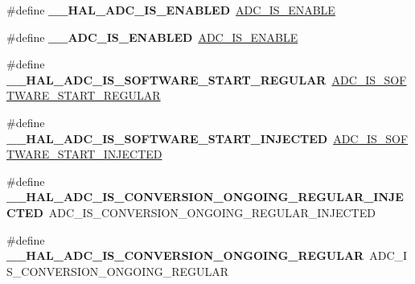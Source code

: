 \begin{DoxyCompactItemize}
\#define {\bfseries \+\_\+\+\_\+\+H\+A\+L\+\_\+\+A\+D\+C\+\_\+\+I\+S\+\_\+\+E\+N\+A\+B\+L\+ED}~\mbox{\hyperlink{group___a_d_c___private___macros_gafe3a7a04ff078c62ae98b19403f696c7}{A\+D\+C\+\_\+\+I\+S\+\_\+\+E\+N\+A\+B\+LE}}
\item 
\mbox{\label{group___h_a_l___a_d_c___aliased___macros_ga32e5ccb7060b98a06749eb20d922d51b}} 
\#define {\bfseries \+\_\+\+\_\+\+A\+D\+C\+\_\+\+I\+S\+\_\+\+E\+N\+A\+B\+L\+ED}~\mbox{\hyperlink{group___a_d_c___private___macros_gafe3a7a04ff078c62ae98b19403f696c7}{A\+D\+C\+\_\+\+I\+S\+\_\+\+E\+N\+A\+B\+LE}}
\item 
\mbox{\label{group___h_a_l___a_d_c___aliased___macros_gad995b81efb72f4fe37152863d465bace}} 
\#define {\bfseries \+\_\+\+\_\+\+H\+A\+L\+\_\+\+A\+D\+C\+\_\+\+I\+S\+\_\+\+S\+O\+F\+T\+W\+A\+R\+E\+\_\+\+S\+T\+A\+R\+T\+\_\+\+R\+E\+G\+U\+L\+AR}~\mbox{\hyperlink{group___a_d_c___private___macros_ga2ccb82ecf85d6c6d1ff2cdf9b6a82d2b}{A\+D\+C\+\_\+\+I\+S\+\_\+\+S\+O\+F\+T\+W\+A\+R\+E\+\_\+\+S\+T\+A\+R\+T\+\_\+\+R\+E\+G\+U\+L\+AR}}
\item 
\mbox{\label{group___h_a_l___a_d_c___aliased___macros_ga5fa40578941f107c4ae1308e14266f7d}} 
\#define {\bfseries \+\_\+\+\_\+\+H\+A\+L\+\_\+\+A\+D\+C\+\_\+\+I\+S\+\_\+\+S\+O\+F\+T\+W\+A\+R\+E\+\_\+\+S\+T\+A\+R\+T\+\_\+\+I\+N\+J\+E\+C\+T\+ED}~\mbox{\hyperlink{group___a_d_c___private___macros_gaa3a1c2197a097b9bb8159b6eb1ac8941}{A\+D\+C\+\_\+\+I\+S\+\_\+\+S\+O\+F\+T\+W\+A\+R\+E\+\_\+\+S\+T\+A\+R\+T\+\_\+\+I\+N\+J\+E\+C\+T\+ED}}
\item 
\mbox{\label{group___h_a_l___a_d_c___aliased___macros_ga573771917c650599112d38dc260f785b}} 
\#define {\bfseries \+\_\+\+\_\+\+H\+A\+L\+\_\+\+A\+D\+C\+\_\+\+I\+S\+\_\+\+C\+O\+N\+V\+E\+R\+S\+I\+O\+N\+\_\+\+O\+N\+G\+O\+I\+N\+G\+\_\+\+R\+E\+G\+U\+L\+A\+R\+\_\+\+I\+N\+J\+E\+C\+T\+ED}~A\+D\+C\+\_\+\+I\+S\+\_\+\+C\+O\+N\+V\+E\+R\+S\+I\+O\+N\+\_\+\+O\+N\+G\+O\+I\+N\+G\+\_\+\+R\+E\+G\+U\+L\+A\+R\+\_\+\+I\+N\+J\+E\+C\+T\+ED
\item 
\mbox{\label{group___h_a_l___a_d_c___aliased___macros_gaf6d1e4fb1fd1bca13b6c22953e805698}} 
\#define {\bfseries \+\_\+\+\_\+\+H\+A\+L\+\_\+\+A\+D\+C\+\_\+\+I\+S\+\_\+\+C\+O\+N\+V\+E\+R\+S\+I\+O\+N\+\_\+\+O\+N\+G\+O\+I\+N\+G\+\_\+\+R\+E\+G\+U\+L\+AR}~A\+D\+C\+\_\+\+I\+S\+\_\+\+C\+O\+N\+V\+E\+R\+S\+I\+O\+N\+\_\+\+O\+N\+G\+O\+I\+N\+G\+\_\+\+R\+E\+G\+U\+L\+AR

\end{DoxyCompactItemize}
